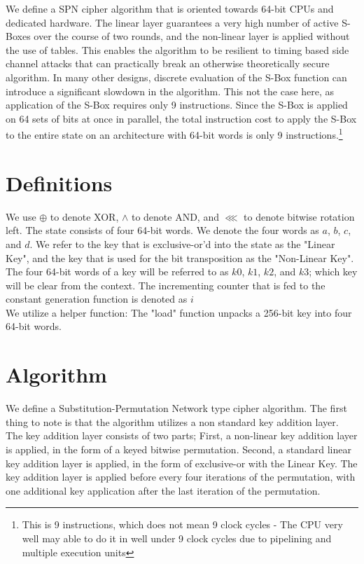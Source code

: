 \documentclass[preprint]{iacrtrans}
\begin{document}
We define a SPN cipher algorithm that is oriented towards 64-bit CPUs and dedicated hardware. The linear layer guarantees a very high number of active S-Boxes over the course of two rounds, and the non-linear layer is applied without the use of tables. This enables the algorithm to be resilient to timing based side channel attacks that can practically break an otherwise theoretically secure algorithm. In many other designs, discrete evaluation of the S-Box function can introduce a significant slowdown in the algorithm. This not the case here, as application of the S-Box requires only 9 instructions. Since the S-Box is applied on 64 sets of bits at once in parallel, the total instruction cost to apply the S-Box to the entire state on an architecture with 64-bit words is only 9 instructions.\footnote{This is 9 instructions, which does not mean 9 clock cycles - The CPU very well may able to do it in well under 9 clock cycles due to pipelining and multiple execution units}


\section{Definitions}
We use $\oplus$ to denote XOR, $\land$ to denote AND, and $\lll$ to denote bitwise rotation left. The state consists of four 64-bit words. We denote the four words as $a$, $b$, $c$, and $d$. We refer to the key that is exclusive-or'd into the state as the "Linear Key", and the key that is used for the bit transposition as the "Non-Linear Key". The four 64-bit words of a key will be referred to as $k0$, $k1$, $k2$, and $k3$; which key will be clear from the context. The incrementing counter that is fed to the constant generation function is denoted as $i$\\

We utilize a helper function: The "load" function unpacks a 256-bit key into four 64-bit words.

\section{Algorithm}
 We define a Substitution-Permutation Network type cipher algorithm. The first thing to note is that the algorithm utilizes a non standard key addition layer. The key addition layer consists of two parts; First, a non-linear key addition layer is applied, in the form of a keyed bitwise permutation. Second, a standard linear key addition layer is applied, in the form of exclusive-or with the Linear Key. The key addition layer is applied before every four iterations of the permutation, with one additional key application after the last iteration of the permutation.
\end{document}
